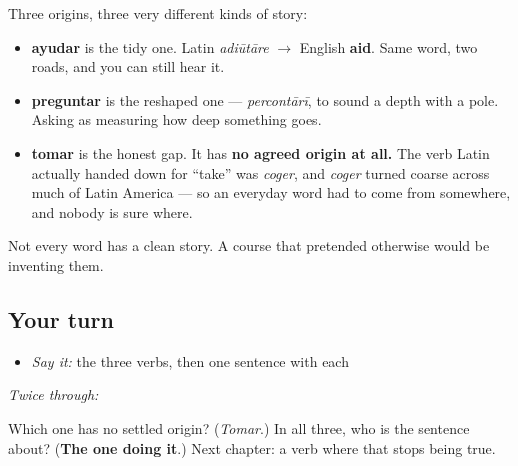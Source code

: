 \begin{cousinweb}
Three origins, three very different kinds of story:

\begin{itemize}
\raggedright
  \item \textbf{ayudar} is the tidy one. Latin \emph{adiūtāre} $\to$ English \textbf{aid}. Same word, two roads, and you can still hear it.
  \item \textbf{preguntar} is the reshaped one — \emph{percontārī}, to sound a depth with a pole. Asking as measuring how deep something goes.
  \item \textbf{tomar} is the honest gap. It has \textbf{no agreed origin at all.} The verb Latin actually handed down for \textquotedblleft{}take\textquotedblright{} was \emph{coger}, and \emph{coger} turned coarse across much of Latin America — so an everyday word had to come from somewhere, and nobody is sure where.
\end{itemize}

Not every word has a clean story. A course that pretended otherwise would be inventing them.
\end{cousinweb}

\subsection*{Your turn}
\begin{itemize}
\raggedright
  \item \emph{Say it:} the three verbs, then one sentence with each
\end{itemize}

\emph{Twice through:}

\begin{tcolorbox}[breakable,colback=teal!4,colframe=teal!35!black,title={Before you move on}]
Which one has no settled origin? (\emph{Tomar}.) In all three, who is the sentence about? (\textbf{The one doing it}.) Next chapter: a verb where that stops being true.
\end{tcolorbox}
